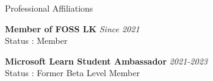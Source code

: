 \documentclass[
	11pt, %
]{./../assets/resume} %
\begin{document}





\begin{rSection}{Professional Affiliations}

	\textbf{Member of FOSS LK} \hfill \textit{Since 2021} \\ 
	Status : Member

	\textbf{Microsoft Learn Student Ambassador} \hfill \textit{2021-2023} \\ 
	Status : Former Beta Level Member

\end{rSection}





\end{document}
